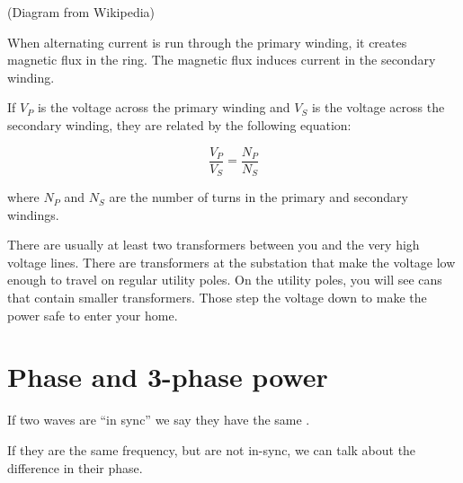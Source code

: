 (Diagram from Wikipedia)

When alternating current is run through the primary winding, it creates magnetic
flux in the ring. The magnetic flux induces current in the secondary
winding.

If $V_P$ is the voltage across the primary winding and $V_S$ is the
voltage across the secondary winding, they are related by the
following equation:

$$\frac{V_P}{V_S} = \frac{N_P}{N_S}$$

where $N_P$ and $N_S$ are the number of turns in the primary and
secondary windings.

There are usually at least two transformers between you and the very
high voltage lines.  There are transformers at the substation that make
the voltage low enough to travel on regular utility poles. On the
utility poles, you will see cans that contain smaller
transformers. Those step the voltage down to make the power safe to
enter your home.

\section{Phase and 3-phase power}

If two waves are ``in sync'' we say they have the same .


If they are the same frequency, but are not in-sync, we can talk about
the difference in their phase.


